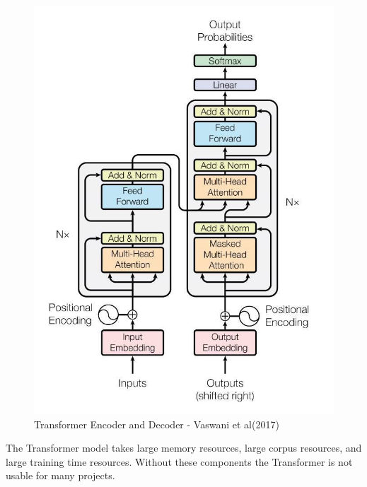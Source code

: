 \begin{figure}[H]
	\begin{center}
		
		
		\includegraphics[scale=2.0]{diagram-mat04}
	\end{center}
	\caption[Transformer Encoder and Decoder]{Transformer Encoder and Decoder - Vaswani et al(2017)\cite{Vaswani2017AttentionIA}}
	
\end{figure}

The Transformer model takes large memory resources, large corpus resources, and large training time resources. Without these components the Transformer is not usable for many projects.